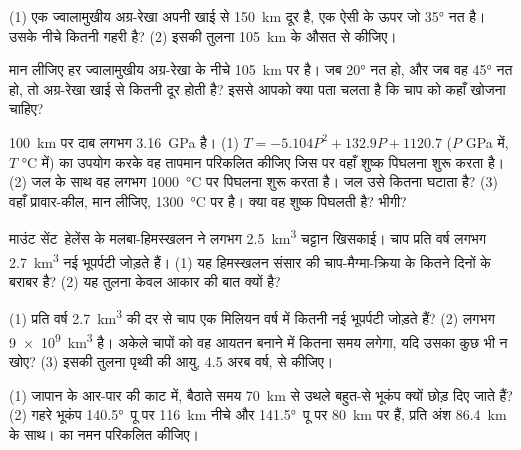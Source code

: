 \begin{exercise}[$\star\star$]\label{exo:g12:subduction-magmatism:6}
(1) एक ज्वालामुखीय अग्र-रेखा अपनी खाई से \qty{150}{km} दूर है, एक ऐसी  के ऊपर जो
\ang{35} नत है। उसके नीचे  कितनी गहरी है? (2) इसकी तुलना
\qty{105}{km} के औसत से कीजिए।
\end{exercise}

\begin{exercise}[$\star\star$]\label{exo:g12:subduction-magmatism:7}
मान लीजिए हर ज्वालामुखीय अग्र-रेखा के नीचे  \qty{105}{km} पर है। जब  \ang{20} नत हो,
और जब वह \ang{45} नत हो, तो अग्र-रेखा खाई से कितनी दूर होती है?
इससे आपको क्या पता चलता है कि चाप को कहाँ खोजना चाहिए?
\end{exercise}

\begin{exercise}[$\star\star$]\label{exo:g12:subduction-magmatism:8}
\qty{100}{km} पर दाब लगभग \qty{3.16}{GPa} है। (1) $T =
-5.104P^2 + 132.9P + 1120.7$ ($P$ \unit{GPa} में, $T$ \unit{\celsius} में) का उपयोग करके
वह तापमान परिकलित कीजिए जिस पर वहाँ शुष्क  पिघलना शुरू करता है।
(2) जल के साथ वह लगभग \qty{1000}{\celsius} पर पिघलना शुरू करता है। जल उसे
कितना घटाता है? (3) वहाँ प्रावार-कील, मान लीजिए,
\qty{1300}{\celsius} पर है। क्या वह शुष्क पिघलती है? भीगी?
\end{exercise}

\begin{exercise}[$\star\star$]\label{exo:g12:subduction-magmatism:9}
माउंट सेंट~हेलेंस के मलबा-हिमस्खलन ने लगभग \qty{2.5}{km^3}
चट्टान खिसकाई। चाप प्रति वर्ष लगभग \qty{2.7}{km^3} नई भूपर्पटी जोड़ते हैं। (1) यह हिमस्खलन
संसार की चाप-मैग्मा-क्रिया के कितने दिनों के बराबर है? (2) यह
तुलना केवल आकार की बात क्यों है?
\end{exercise}

\begin{exercise}[$\star\star$]\label{exo:g12:subduction-magmatism:10}
(1) प्रति वर्ष \qty{2.7}{km^3} की दर से चाप एक मिलियन वर्ष में कितनी नई भूपर्पटी
जोड़ते हैं? (2)  लगभग \qty{9e9}{km^3} है। अकेले
चापों को वह आयतन बनाने में कितना समय लगेगा, यदि उसका कुछ भी न खोए? (3) इसकी तुलना
पृथ्वी की आयु, 4.5 अरब वर्ष, से कीजिए।
\end{exercise}

\begin{exercise}[$\star\star$]\label{exo:g12:subduction-magmatism:11}
(1) जापान के आर-पार की काट में,  बैठाते समय \qty{70}{km} से उथले
बहुत-से भूकंप क्यों छोड़ दिए जाते हैं? (2) गहरे भूकंप
\ang{140.5}~पू पर \qty{116}{km} नीचे और \ang{141.5}~पू पर \qty{80}{km} पर हैं, प्रति अंश
\qty{86.4}{km} के साथ।  का नमन परिकलित कीजिए।
\end{exercise}

